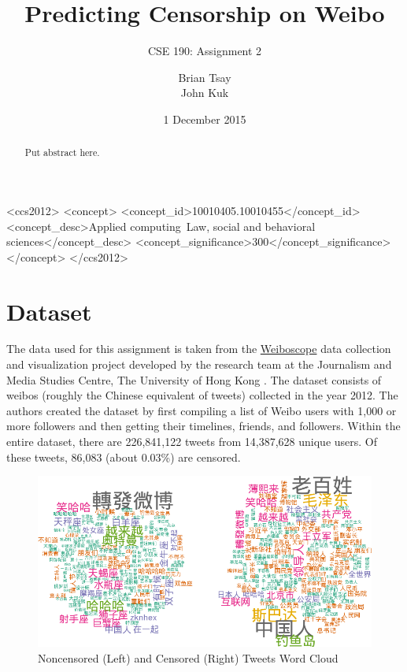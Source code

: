\documentclass{sig-alternate-05-2015}
\begin{document}
\title{Predicting Censorship on Weibo}
\subtitle{CSE 190: Assignment 2}

\author{
  \alignauthor
  Brian Tsay \\
  \alignauthor
  John Kuk \\
}

\date{1 December 2015}

\maketitle

\begin{abstract}
  Put abstract here.
\end{abstract}


 \begin{CCSXML}
<ccs2012>
<concept>
<concept_id>10010405.10010455</concept_id>
<concept_desc>Applied computing~Law, social and behavioral sciences</concept_desc>
<concept_significance>300</concept_significance>
</concept>
</ccs2012>
\end{CCSXML}

\printccsdesc

\section{Dataset} \label{sec:data}
The data used for this assignment is taken from the \href{http://weiboscope.jmsc.hku.hk/datazip/}{Weiboscope} data collection and visualization project developed by the research team at the Journalism and Media Studies Centre, The University of Hong Kong \cite{Fu2013a}. The dataset consists of weibos (roughly the Chinese equivalent of tweets) collected in the year 2012. The authors created the dataset by first compiling a list of Weibo users with 1,000 or more followers and then getting their timelines, friends, and followers. Within the entire dataset, there are 226,841,122 tweets from 14,387,628 unique users. Of these tweets, 86,083 (about 0.03\%) are censored.

\begin{figure}
  \centering
  \includegraphics[scale = 0.65]{wc.png}
  \caption{Noncensored (Left) and Censored (Right) Tweets Word Cloud}
  \label{fig:wordcloud}
\end{figure}
\end{document}
